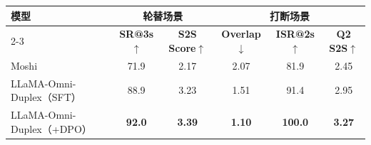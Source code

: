 \begin{table}[!htbp]
    \label{tab:fullduplex_main}
    \centering
    \small
    \begin{tabular}{lccccc}
        \toprule
        \multirow{2}{*}{\textbf{模型}} & \multicolumn{2}{c}{\textbf{轮替场景}} & \multicolumn{3}{c}{\textbf{打断场景}} \\
        \cmidrule{2-3} \cmidrule{4-6}
        & \textbf{SR@3s$\uparrow$} & \textbf{S2S Score$\uparrow$} & \textbf{Overlap$\downarrow$} & \textbf{ISR@2s$\uparrow$} & \textbf{Q2 S2S$\uparrow$} \\
        \midrule
        Moshi & 71.9 & 2.17 & 2.07 & 81.9 & 2.45 \\
        LLaMA-Omni-Duplex（SFT） & 88.9 & 3.23 & 1.51 & 91.4 & 2.95 \\
        LLaMA-Omni-Duplex（+DPO） & \textbf{92.0} & \textbf{3.39} & \textbf{1.10} & \textbf{100.0} & \textbf{3.27} \\
        \bottomrule
    \end{tabular}
\end{table}
